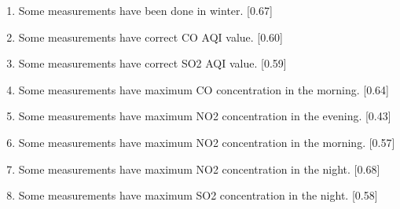 \documentclass{classrep}
\begin{document}
{{\begin{enumerate}
                \item Some measurements have been done in winter. [0.67]
                \item Some measurements have correct CO AQI value. [0.60]
                \item Some measurements have correct SO2 AQI value. [0.59]
                \item Some measurements have maximum CO concentration in the morning. [0.64]
                \item Some measurements have maximum NO2 concentration in the evening. [0.43]
                \item Some measurements have maximum NO2 concentration in the morning. [0.57]
                \item Some measurements have maximum NO2 concentration in the night. [0.68]
                \item Some measurements have maximum SO2 concentration in the night. [0.58]
            \end{enumerate}
        }

}
\end{document}
